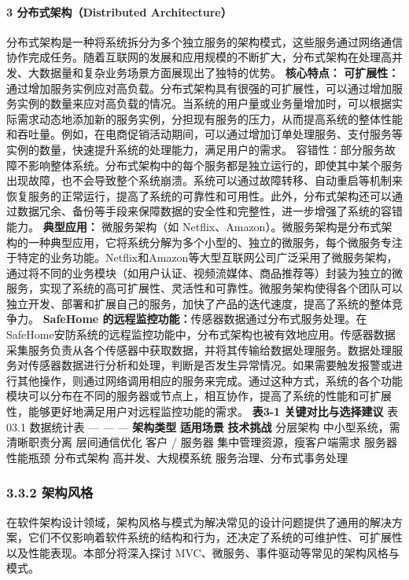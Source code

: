 \paragraph{3 分布式架构（Distributed Architecture）}\label{ux5206ux5e03ux5f0fux67b6ux6784distributed-architecture}
分布式架构是一种将系统拆分为多个独立服务的架构模式，这些服务通过网络通信协作完成任务。随着互联网的发展和应用规模的不断扩大，分布式架构在处理高并发、大数据量和复杂业务场景方面展现出了独特的优势。 \textbf{核心特点：}
\textbf{可扩展性：}通过增加服务实例应对高负载。分布式架构具有很强的可扩展性，可以通过增加服务实例的数量来应对高负载的情况。当系统的用户量或业务量增加时，可以根据实际需求动态地添加新的服务实例，分担现有服务的压力，从而提高系统的整体性能和吞吐量。例如，在电商促销活动期间，可以通过增加订单处理服务、支付服务等实例的数量，快速提升系统的处理能力，满足用户的需求。
容错性：部分服务故障不影响整体系统。分布式架构中的每个服务都是独立运行的，即使其中某个服务出现故障，也不会导致整个系统崩溃。系统可以通过故障转移、自动重启等机制来恢复服务的正常运行，提高了系统的可靠性和可用性。此外，分布式架构还可以通过数据冗余、备份等手段来保障数据的安全性和完整性，进一步增强了系统的容错能力。
\textbf{典型应用：} 微服务架构（如
Netflix、Amazon）。微服务架构是分布式架构的一种典型应用，它将系统分解为多个小型的、独立的微服务，每个微服务专注于特定的业务功能。Netflix和Amazon等大型互联网公司广泛采用了微服务架构，通过将不同的业务模块（如用户认证、视频流媒体、商品推荐等）封装为独立的微服务，实现了系统的高可扩展性、灵活性和可靠性。微服务架构使得各个团队可以独立开发、部署和扩展自己的服务，加快了产品的迭代速度，提高了系统的整体竞争力。
\textbf{SafeHome
的远程监控功能：}传感器数据通过分布式服务处理。在SafeHome安防系统的远程监控功能中，分布式架构也被有效地应用。传感器数据采集服务负责从各个传感器中获取数据，并将其传输给数据处理服务。数据处理服务对传感器数据进行分析和处理，判断是否发生异常情况。如果需要触发报警或进行其他操作，则通过网络调用相应的服务来完成。通过这种方式，系统的各个功能模块可以分布在不同的服务器或节点上，相互协作，提高了系统的性能和可扩展性，能够更好地满足用户对远程监控功能的需求。
\textbf{表3-1 关键对比与选择建议} 表03.1 数据统计表 \textbar---\textbar{} --- \textbar---\textbar{} \textbar{}\textbf{架构类型}\textbar{}
\textbf{适用场景} \textbar{}\textbf{技术挑战}\textbar{} \textbar 分层架构\textbar{} 中小型系统，需清晰职责分离 \textbar 层间通信优化\textbar{} \textbar
客户 / 服务器\textbar{} 集中管理资源，瘦客户端需求 \textbar 服务器性能瓶颈\textbar{} \textbar 分布式架构\textbar{} 高并发、大规模系统 \textbar
服务治理、分布式事务处理\textbar{} \subsubsection{3.3.2 架构风格}\label{ux67b6ux6784ux98ceux683c}
在软件架构设计领域，架构风格与模式为解决常见的设计问题提供了通用的解决方案，它们不仅影响着软件系统的结构和行为，还决定了系统的可维护性、可扩展性以及性能表现。本部分将深入探讨 MVC、微服务、事件驱动等常见的架构风格与模式。

